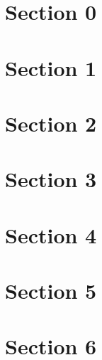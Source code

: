 \documentclass[9pt]{article}
\begin{document}
   \section{Section 0}
      
   \section{Section 1}
      
   \section{Section 2}
      
   \section{Section 3}
      
   \section{Section 4}
      
   \section{Section 5}
      
   \section{Section 6}
      
\end{document}
